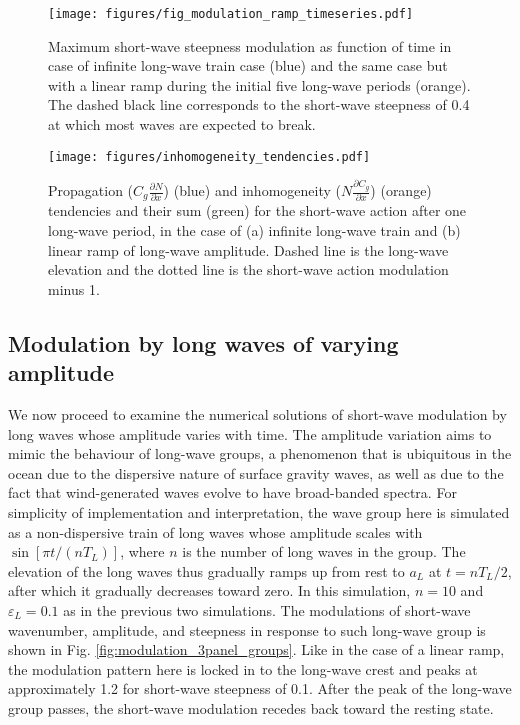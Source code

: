 \documentclass[lineno]{jfm}
\begin{document}
\begin{figure}
  \centering
  \texttt{[image: figures/fig\_modulation\_ramp\_timeseries.pdf]}
  \caption{
    Maximum short-wave steepness modulation as function of time in case of
    infinite long-wave train case (blue) and the same case but with a linear
    ramp during the initial five long-wave periods (orange). The dashed black
    line corresponds to the short-wave steepness of 0.4 at which most waves are
    expected to break.
  }
  \label{fig:unsteady_growth_timeseries}
\end{figure}

\begin{figure}
  \centering
  \texttt{[image: figures/inhomogeneity\_tendencies.pdf]}
  \caption{
    Propagation ($C_g \frac{\partial N}{\partial x}$) (blue) and inhomogeneity
    ($N \frac{\partial C_g}{\partial x}$) (orange) tendencies and their sum
    (green) for the short-wave action after one long-wave period, in the case of
    (a) infinite long-wave train and (b) linear ramp of long-wave amplitude.
    Dashed line is the long-wave elevation and the dotted line is the short-wave
    action modulation minus 1.
  }
  \label{fig:inhomogeneity_tendencies}
\end{figure}

\subsection{Modulation by long waves of varying amplitude}
\label{subsection:wave_groups}

We now proceed to examine the numerical solutions of short-wave modulation by
long waves whose amplitude varies with time.
The amplitude variation aims to mimic the behaviour of long-wave groups, a
phenomenon that is ubiquitous in the ocean due to the dispersive nature of
surface gravity waves, as well as due to the fact that wind-generated waves
evolve to have broad-banded spectra.
For simplicity of implementation and interpretation, 
the wave group here is simulated as a non-dispersive train of long waves whose
amplitude scales with $\sin[\pi t / (n T_L)]$, where $n$ is the number of
long waves in the group.
The elevation of the long waves thus gradually ramps up from rest to $a_L$ at
$t = n T_L / 2$, after which it gradually decreases toward zero.
In this simulation, $n = 10$ and $\varepsilon_L = 0.1$ as in the previous two
simulations.
The modulations of short-wave wavenumber, amplitude, and steepness in response
to such long-wave group is shown in Fig. \ref{fig:modulation_3panel_groups}.
Like in the case of a linear ramp, the modulation pattern here is locked in to
the long-wave crest and peaks at approximately 1.2 for short-wave steepness of 0.1.
After the peak of the long-wave group passes, the short-wave modulation recedes
back toward the resting state.
\end{document}
